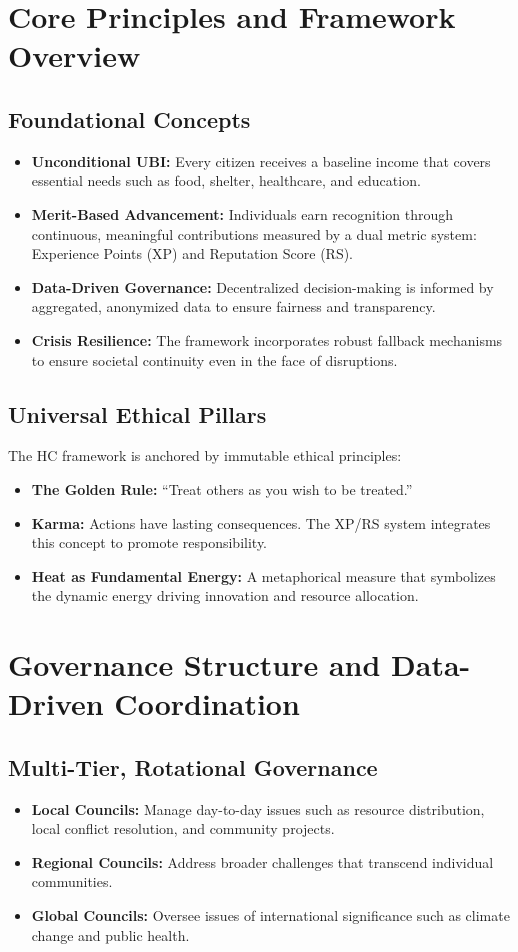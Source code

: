 \documentclass[12pt]{article}
\begin{document}
\section{Core Principles and Framework Overview}
\subsection{Foundational Concepts}
\begin{itemize}
    \item \textbf{Unconditional UBI:} Every citizen receives a baseline income that covers essential needs such as food, shelter, healthcare, and education.
    \item \textbf{Merit-Based Advancement:} Individuals earn recognition through continuous, meaningful contributions measured by a dual metric system: Experience Points (XP) and Reputation Score (RS).
    \item \textbf{Data-Driven Governance:} Decentralized decision-making is informed by aggregated, anonymized data to ensure fairness and transparency.
    \item \textbf{Crisis Resilience:} The framework incorporates robust fallback mechanisms to ensure societal continuity even in the face of disruptions.
\end{itemize}

\subsection{Universal Ethical Pillars}
The HC framework is anchored by immutable ethical principles:
\begin{itemize}
    \item \textbf{The Golden Rule:} “Treat others as you wish to be treated.”
    \item \textbf{Karma:} Actions have lasting consequences. The XP/RS system integrates this concept to promote responsibility.
    \item \textbf{Heat as Fundamental Energy:} A metaphorical measure that symbolizes the dynamic energy driving innovation and resource allocation.
\end{itemize}

\section{Governance Structure and Data-Driven Coordination}
\subsection{Multi-Tier, Rotational Governance}
\begin{itemize}
    \item \textbf{Local Councils:} Manage day-to-day issues such as resource distribution, local conflict resolution, and community projects.
    \item \textbf{Regional Councils:} Address broader challenges that transcend individual communities.
    \item \textbf{Global Councils:} Oversee issues of international significance such as climate change and public health.
\end{itemize}
\end{document}
